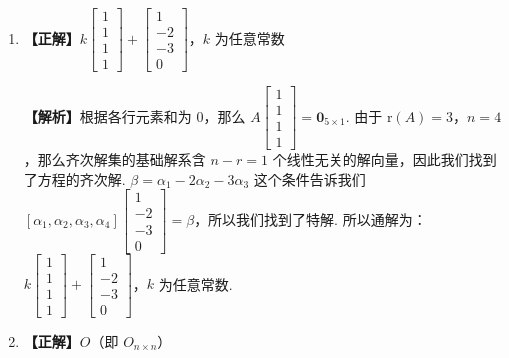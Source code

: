 \documentclass[a4paper,11pt]{ctexart}
\newcommand{\rk}{\mathrm{r}}
\begin{document}
\begin{enumerate}[label=\arabic*., leftmargin=2em, itemsep=0.75em, topsep=0.5em]
  \item \textbf{【正解】}$k \begin{bmatrix} 1 \\ 1 \\ 1 \\ 1 \end{bmatrix} + \begin{bmatrix} 1 \\ -2 \\ -3 \\ 0 \end{bmatrix}$，$k$ 为任意常数

  \textbf{【解析】}根据各行元素和为 $0$，那么 $A \begin{bmatrix} 1 \\ 1 \\ 1 \\ 1 \end{bmatrix} = \mathbf{0}_{5 \times 1}$. 由于 $\rk(A) = 3$，$n = 4$，那么齐次解集的基础解系含 $n - r = 1$ 个线性无关的解向量，因此我们找到了方程的齐次解. $\beta = \alpha_1 - 2\alpha_2 - 3\alpha_3$ 这个条件告诉我们 $[\alpha_1, \alpha_2, \alpha_3, \alpha_4] \begin{bmatrix} 1 \\ -2 \\ -3 \\ 0 \end{bmatrix} = \beta$，所以我们找到了特解. 所以通解为：$k \begin{bmatrix} 1 \\ 1 \\ 1 \\ 1 \end{bmatrix} + \begin{bmatrix} 1 \\ -2 \\ -3 \\ 0 \end{bmatrix}$，$k$ 为任意常数.

  \item \textbf{【正解】}$O$（即 $O_{n \times n}$）


\end{enumerate}
\end{document}

